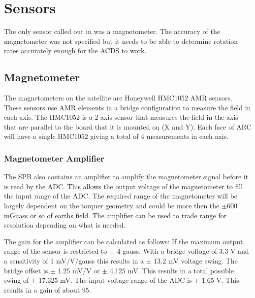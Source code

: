 

\section{Sensors}

The only sensor called out in \cite{Mentch11} was a magnetometer. The accuracy of the magnetometer was not specified but it needs to be able to determine rotation rates accurately enough for the \ac{ACDS} to work.

\subsection{Magnetometer}

The magnetometers on the satellite are Honeywell HMC1052 \ac{AMR} sensors. These sensors use \ac{AMR} elements in a bridge configuration to measure the field in each axis. The HMC1052 is a 2-axis sensor that measures the field in the axis that are parallel to the board that it is mounted on (X and Y). Each face of \ac{ARC} will have a single HMC1052 giving a total of 4 measurements in each axis.

\subsubsection{Magnetometer Amplifier}


The \ac{SPB} also contains an amplifier to amplify the magnetometer signal before it is read by the \ac{ADC}. This allows the output voltage of the magnetometer to fill the input range of the \ac{ADC}. The required range of the magnetometer will be largely dependent on the torquer geometry and could be more then the $\pm$600 mGuass or so of earths field. The amplifier can be used to trade range for resolution depending on what is needed.

The gain for the amplifier can be calculated as follows: If the maximum output range of the sensor is restricted to $\pm$ 4 gauss. With a bridge voltage of 3.3 V and a sensitivity of 1 mV/V/gauss this results in a $\pm$ 13.2 mV voltage swing. The bridge offset is $\pm$ 1.25 mV/V or $\pm$ 4.125 mV. This results in a total possible swing of $\pm$ 17.325 mV. The input voltage range of the \ac{ADC} is $\pm$ 1.65 V. This results in a gain of about 95. 

